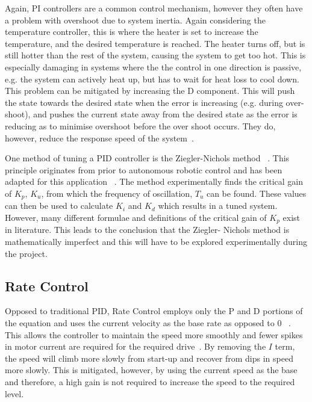Again, PI controllers are a common control mechanism, however they often have 
a problem with overshoot due to system inertia. Again considering the 
temperature controller, this is where the heater is set to increase the 
temperature, and the desired temperature is reached. The heater turns off, but 
is still hotter than the rest of the system, causing the system to get too hot. 
This is especially damaging in systems where the the control in one direction 
is passive, e.g. the system can actively heat up, but has to wait for heat loss 
to cool down. This problem can be mitigated by increasing the D component. 
This will push the state towards the desired state when the error is increasing 
(e.g. during over-shoot), and pushes the current state away from the desired 
state as the error is reducing as to minimise overshoot before the over shoot 
occurs. They do, however, reduce the response speed of the system~\cite{chen2007linear}.

One method of tuning a PID controller is the Ziegler-Nichols method~
\cite{ziegler1942optimum}. This principle originates from prior to autonomous 
robotic control and has been adapted for this application~
\cite{aastrom2004revisiting}. The method experimentally finds the critical gain 
of $K_p$, $K_u$, from which the frequency of oscillation, $T_u$ can be found. 
These values can then be used to calculate $K_i$ and $K_d$ which results in a 
tuned system. However, many different formulae and definitions of the critical 
gain of $K_p$ exist in literature. This leads to the conclusion that the Ziegler-
Nichols method is mathematically imperfect and this will have to be explored 
experimentally during the project.     

\subsection{Rate Control}\label{litreview/robotics/ratecontrol}
Opposed to traditional PID, Rate Control employs only the P and D portions of 
the equation and uses the current velocity as the base rate as opposed to 0~
\cite{koditschek1987quadratic}. This allows the controller to maintain the speed 
more smoothly and fewer spikes in motor current are required for the required 
drive~\cite{kawamura1988local}. By removing the $I$ term, the speed will climb 
more slowly from start-up and recover from dips in speed more slowly. This is 
mitigated, however, by using the current speed as the base and therefore, a high 
gain is not required to increase the speed to the required level. 

